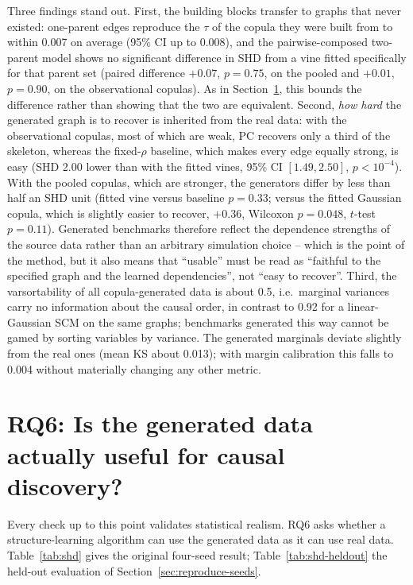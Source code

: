 \documentclass[
  english,
  class=report,
  accentcolor=2c,
  marginpar=false,
  parskip=half-,
  fontsize=11pt,
  ruledheaders=false,
  pdfa=false,
  IMRAD=false,
  thesis={type=master}
]{tudapub}
\begin{document}
Three findings stand out. First, the building blocks transfer to graphs
that never existed: one-parent edges reproduce the $\tau$ of the copula they
were built from to within 0.007 on average (95\% CI up to 0.008), and the
pairwise-composed two-parent model shows no significant difference in SHD
from a vine fitted specifically for that parent set (paired difference
$+0.07$, $p = 0.75$, on the pooled and
$+0.01$, $p = 0.90$, on the observational copulas). As in
Section~\ref{sec:closing-loop}, this bounds the difference rather than
showing that the two are equivalent.
Second, \emph{how hard} the generated graph is to recover is inherited from
the real data: with the observational copulas, most of which are weak, PC
recovers only a third of the skeleton, whereas the fixed-$\rho$ baseline,
which makes every edge equally strong, is easy (SHD
2.00 lower than with the fitted vines, 95\% CI
$[1.49, 2.50]$, $p < 10^{-4}$). With the pooled copulas, which are
stronger, the generators differ by less than half an SHD unit (fitted
vine versus baseline $p = 0.33$; versus the fitted Gaussian copula,
which is slightly easier to recover, $+0.36$, Wilcoxon
$p = 0.048$, $t$-test $p = 0.11$). Generated benchmarks therefore reflect
the dependence strengths of the source data rather than an arbitrary
simulation choice -- which is the point of the method, but it also means
that ``usable'' must be read as ``faithful to the specified graph and the
learned dependencies'', not ``easy to recover''. Third, the varsortability
of all copula-generated data is about 0.5, i.e.\ marginal variances carry
no information about the causal order, in contrast to
0.92 for a linear-Gaussian SCM on the same graphs;
benchmarks generated this way cannot be gamed by sorting variables by
variance. The generated marginals deviate slightly from the real ones
(mean KS about 0.013); with margin calibration this falls to 0.004
without materially changing any other metric.

\section{RQ6: Is the generated data actually useful for causal discovery?}
\label{sec:closing-loop}
Every check up to this point validates statistical realism. RQ6 asks
whether a structure-learning algorithm can use the generated data as it
can use real data. Table~\ref{tab:shd} gives the original four-seed result;
Table~\ref{tab:shd-heldout} the held-out evaluation of
Section~\ref{sec:reproduce-seeds}.
\end{document}
